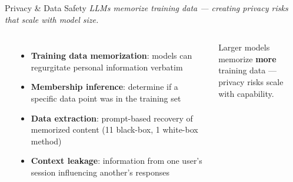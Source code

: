 \iffalse
\begin{frame}{Privacy \& Data Safety}
  {\footnotesize\itshape LLMs memorize training data --- creating privacy risks
    that scale with model size.}
  \vspace{0.3em}

  \begin{columns}[T]
    {\small\bfseries{}}
    \begin{itemize}\scriptsize\setlength\itemsep{3pt}
      \item \textbf{Training data memorization}: models can regurgitate
        personal information verbatim
      \item \textbf{Membership inference}: determine if a specific
        data point was in the training set
      \item \textbf{Data extraction}: prompt-based recovery of
        memorized content (11 black-box, 1 white-box method)
      \item \textbf{Context leakage}: information from one user's
        session influencing another's responses
    \end{itemize}
    \vspace{0.3em}
    \begin{ucrwarn}
      \centering\scriptsize
      Larger models memorize \textbf{more} training data ---\\
      privacy risks scale with capability.
    \end{ucrwarn}


\end{columns}
\end{frame}
